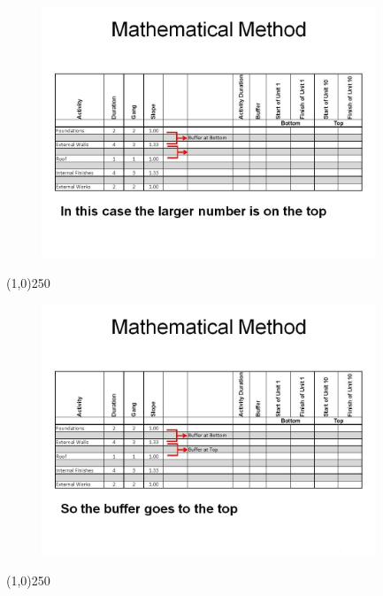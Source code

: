 \begin{frame}
\begin{figure}
	\centering
		\includegraphics[width = 10.0cm]{oldnotes/Slide275.jpg}
\end{figure}
\end{frame}
\begin{center}\line(1,0){250}\end{center}






\begin{frame}
\begin{figure}
	\centering
		\includegraphics[width = 10.0cm]{oldnotes/Slide276.jpg}
\end{figure}
\end{frame}
\begin{center}\line(1,0){250}\end{center}






